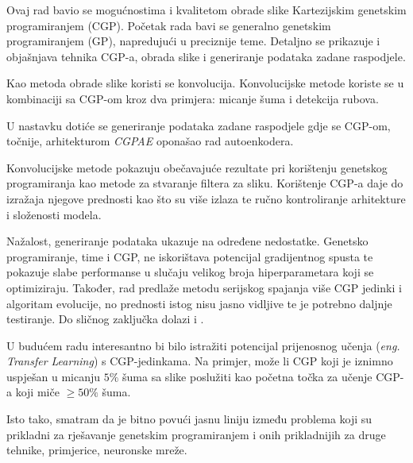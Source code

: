 Ovaj rad bavio se mogućnostima i kvalitetom obrade slike Kartezijskim genetskim programiranjem (CGP).
Početak rada bavi se generalno genetskim programiranjem (GP), napredujući u preciznije teme.
Detaljno se prikazuje i objašnjava tehnika CGP-a, obrada slike i generiranje podataka zadane raspodjele.

Kao metoda obrade slike koristi se konvolucija.
Konvolucijske metode koriste se u kombinaciji sa CGP-om kroz dva primjera: micanje šuma i detekcija rubova.

U nastavku dotiće se generiranje podataka zadane raspodjele gdje se CGP-om, točnije, arhitekturom \emph{CGPAE} oponašao rad autoenkodera.

Konvolucijske metode pokazuju obečavajuće rezultate pri korištenju genetskog programiranja kao metode za stvaranje filtera za sliku.
Korištenje CGP-a daje do izražaja njegove prednosti kao što su više izlaza te ručno kontroliranje arhitekture i složenosti modela.

Nažalost, generiranje podataka ukazuje na određene nedostatke.
Genetsko programiranje, time i CGP, ne iskorištava potencijal gradijentnog spusta te pokazuje slabe performanse u slučaju velikog broja hiperparametara koji se optimiziraju.
Također, rad predlaže metodu serijskog spajanja više CGP jedinki i algoritam evolucije, no prednosti istog nisu jasno vidljive te je potrebno daljnje testiranje.
Do sličnog zaključka dolazi i \cite{conv_gen_programming}.

U budućem radu interesantno bi bilo istražiti potencijal prijenosnog učenja (\emph{eng. Transfer Learning}) s CGP-jedinkama.
Na primjer, može li CGP koji je iznimno uspješan u micanju $5\%$ šuma sa slike poslužiti kao početna točka za učenje CGP-a koji miče $\geq 50\%$ šuma.

Isto tako, smatram da je bitno povući jasnu liniju između problema koji su prikladni za rješavanje genetskim programiranjem i onih prikladnijih za druge tehnike, primjerice, neuronske mreže.

